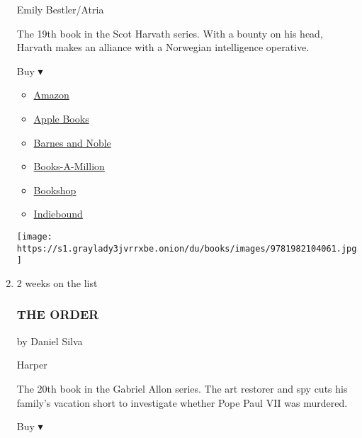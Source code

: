 \begin{enumerate}
  Emily Bestler/Atria

  The 19th book in the Scot Harvath series. With a bounty on his head,
  Harvath makes an alliance with a Norwegian intelligence operative.

  Buy ▾

  \begin{itemize}
  \tightlist
  \item
    \href{https://www.amazon.com/dp/1982104066?tag=NYTBSREV-20\&tag=NYTBS-20}{Amazon}
  \item
    \href{https://du-gae-books-dot-nyt-du-prd.appspot.com/buy?title=NEAR+DARK\&author=Brad+Thor}{Apple
    Books}
  \item
    \href{https://www.anrdoezrs.net/click-7990613-11819508?url=https\%3A\%2F\%2Fwww.barnesandnoble.com\%2Fw\%2F\%3Fean\%3D9781982104061}{Barnes
    and Noble}
  \item
    \href{https://www.anrdoezrs.net/click-7990613-35140?url=https\%3A\%2F\%2Fwww.booksamillion.com\%2Fp\%2FNEAR\%2BDARK\%2FBrad\%2BThor\%2F9781982104061}{Books-A-Million}
  \item
    \href{https://bookshop.org/a/3546/9781982104061}{Bookshop}
  \item
    \href{https://www.indiebound.org/book/9781982104061?aff=NYT}{Indiebound}
  \end{itemize}

  \texttt{[image: https://s1.graylady3jvrrxbe.onion/du/books/images/9781982104061.jpg]}
\item
  2 weeks on the list

  \hypertarget{the-order}{%
  \subsubsection{THE ORDER}\label{the-order}}

  by Daniel Silva

  Harper

  The 20th book in the Gabriel Allon series. The art restorer and spy
  cuts his family's vacation short to investigate whether Pope Paul VII
  was murdered.

  Buy ▾


\end{enumerate}
